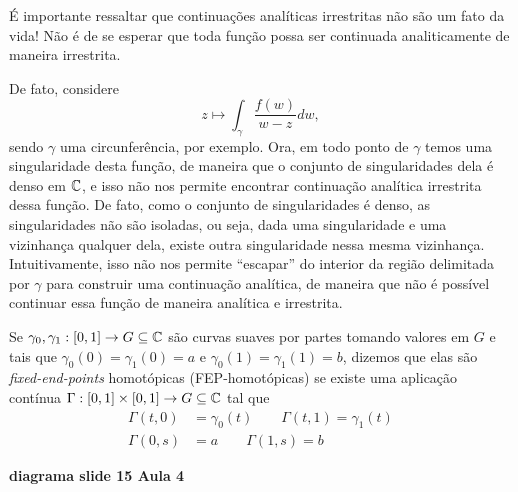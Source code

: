     \begin{observacao}
        É importante ressaltar que continuações analíticas irrestritas não são um fato da vida!
        Não é de se esperar que toda função possa ser continuada analiticamente de maneira
        irrestrita.
        
        De fato, considere
        \begin{equation*}
            z\mapsto \int_{\gamma} \frac{f(w)}{w-z}dw,
        \end{equation*}
        sendo $\gamma$ uma circunferência, por exemplo. Ora, em todo ponto de $\gamma$
        temos uma singularidade desta função, de maneira que o conjunto de singularidades
        dela é denso em $\mathbb{C}$, e isso não nos permite encontrar continuação analítica 
        irrestrita dessa função. De fato, como o conjunto de singularidades é denso, as 
        singularidades não são isoladas, ou seja, dada uma singularidade e uma vizinhança
        qualquer dela, existe outra singularidade nessa mesma vizinhança. Intuitivamente, 
        isso não nos permite ``escapar'' do interior da região delimitada por $\gamma$ para
        construir uma continuação analítica, de maneira que não é possível continuar 
        essa função de maneira analítica e irrestrita.
    \end{observacao}

    \begin{definicao}
    \label{def-fep-homotopicas}
        Se $\gamma_0, \gamma_1 :[0,1]\to G\subseteq\mathbb{C}$ são curvas 
        suaves por partes tomando valores em $G$ e tais que 
        $\gamma_0(0) = \gamma_1(0) = a$ e $\gamma_0(1) = \gamma_1(1) = b$, 
        dizemos que elas são \textit{fixed-end-points}
        homotópicas (FEP-homotópicas) se existe uma aplicação contínua 
        $\Gamma:[0,1]\times [0,1] \to G\subseteq\mathbb{C}$ tal que
        \begin{align*}
            \Gamma(t,0) &= \gamma_0(t) \qquad \Gamma(t,1) = \gamma_1(t) \\
            \Gamma(0,s) &= a \qquad \Gamma(1,s) = b
        \end{align*}
        \begin{center}
            \textbf{diagrama slide 15 Aula 4}
        \end{center}
    \end{definicao}

